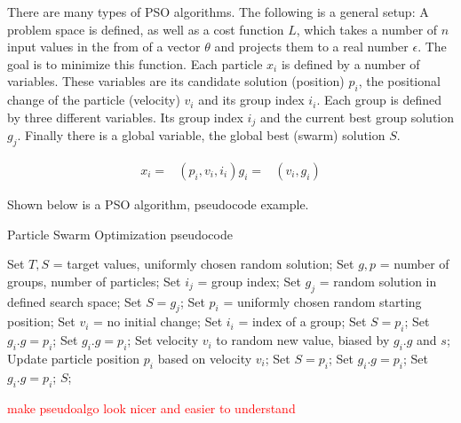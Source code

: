 There are many types of PSO algorithms. The following is a general setup:\newline
A problem space is defined, as well as a cost function $L$, which takes a number of $n$ input values in the from of a vector $\theta$ and projects them
to a real number $\epsilon$. The goal is to minimize this function. Each particle $x_i$ is defined by a number of variables. These variables are
its candidate solution (position) $p_i$, the positional change of the particle (velocity) $v_i$ and its group index $i_i$. Each group is defined by
three different variables. Its group index $i_j$ and the current best group solution $g_j$. Finally there is a global variable, the global best
(swarm) solution $S$.

\begin{align}
	x_i =& (p_i, v_i, i_i)
	g_i =& (v_i, g_i)
\end{align}

Shown below is a PSO algorithm, pseudocode example.

\begin{algorithm}
	\caption{Particle Swarm Optimization pseudocode}
	\begin{algorithmic}
		\State Set $T, S$ = target values, uniformly chosen random solution;
		\State Set $g, p$ = number of groups, number of particles;
			\State Set $i_j$ = group index;
			\State Set $g_j$ = random solution in defined search space;
				\State Set $S = g_j$;
			\EndIf
		\EndFor
			\State Set $p_i$ = uniformly chosen random starting position;
			\State Set $v_i$ = no initial change;
			\State Set $i_i$ = index of a group;
				\State Set $S = p_i$;
				\State Set $g_i.g = p_i$;
				\State Set $g_i.g = p_i$;
			\EndIf
		\EndFor
				\State Set velocity $v_i$ to random new value, biased by $g_i.g$ and $s$;
				\State Update particle position $p_i$ based on velocity $v_i$;
					\State Set $S = p_i$;
					\State Set $g_i.g = p_i$;
					\State Set $g_i.g = p_i$;
				\EndIf
			\EndFor
		\EndWhile
		\State {} $S$;
	\end{algorithmic}
\end{algorithm}

\textcolor{red}{make pseudoalgo look nicer and easier to understand}


